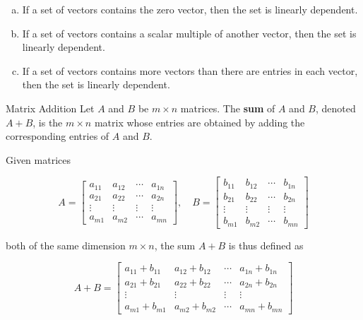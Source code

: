 \begin{theorem}
    \begin{enumerate}[(a)]
        \item If a set of vectors contains the zero vector, then the set is linearly dependent.
        \item If a set of vectors contains a scalar multiple of another vector, then the set is linearly dependent.
        \item If a set of vectors contains more vectors than there are entries in each vector, then the set is linearly dependent.
    \end{enumerate}
\end{theorem}


\begin{definition}{Matrix Addition}
    Let $A$ and $B$ be $m \times n$ matrices. The \textbf{sum} of $A$ and $B$, denoted $A + B$, is the $m \times n$ matrix whose entries are obtained by adding the corresponding entries of $A$ and $B$.

    Given matrices

    $$
    A=\left[\begin{array}{cccc}
    a_{11} & a_{12} & \cdots & a_{1 n} \\
    a_{21} & a_{22} & \cdots & a_{2 n} \\
    \vdots & \vdots & \vdots & \vdots \\
    a_{m 1} & a_{m 2} & \cdots & a_{m n}
    \end{array}\right], \quad B=\left[\begin{array}{cccc}
    b_{11} & b_{12} & \cdots & b_{1 n} \\
    b_{21} & b_{22} & \cdots & b_{2 n} \\
    \vdots & \vdots & \vdots & \vdots \\
    b_{m 1} & b_{m 2} & \cdots & b_{m n}
    \end{array}\right]
    $$

    both of the same dimension $m \times n$, the sum $A+B$ is thus defined as

    $$
    A+B=\left[\begin{array}{cccc}
    a_{11}+b_{11} & a_{12}+b_{12} & \cdots & a_{1 n}+b_{1 n} \\
    a_{21}+b_{21} & a_{22}+b_{22} & \cdots & a_{2 n}+b_{2 n} \\
    \vdots & \vdots & \vdots & \vdots \\
    a_{m 1}+b_{m 1} & a_{m 2}+b_{m 2} & \cdots & a_{m n}+b_{m n}
    \end{array}\right]
    $$
\end{definition}


